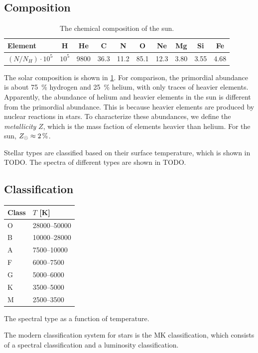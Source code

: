\subsection{Composition}
\begin{table}
	\begin{tabular}{lccccccccc}
	\toprule
	Element & H & He & C & N & O & Ne & Mg & Si & Fe\\
	\midrule
	$(N/N_H) \cdot 10^5$ & $10^5$ & 9800 & 36.3 & 11.2 & 85.1 & 12.3 & 3.80 & 3.55 & 4.68\\
	\bottomrule
	\end{tabular}
	\caption{The chemical composition of the sun.}
	\label{tab:solar-comp}
\end{table}
The solar composition is shown in \cref{tab:solar-comp}.
For comparison, the primordial abundance is about \SI{75}{\percent} hydrogen and \SI{25}{\percent} helium, with only traces of heavier elements.
Apparently, the abundance of helium and heavier elements in the sun is different from the primordial abundance.
This is because heavier elements are produced by nuclear reactions in stars.
To characterize these abundances, we define the \emph{metallicity} $Z$, which is the mass faction of elements heavier than helium.
For the sun, $Z_\odot \approx \SI{2}{\percent}$.

Stellar types are classified based on their surface temperature, which is shown in TODO.
The spectra of different types are shown in TODO.


\subsection{Classification}
\begin{margintable}
	\begin{tabular}{ll}
		\toprule
		Class & $T$ [K]\\
		\midrule
		O & \num{28000}--\num{50000}\\
		B & \num{10000}--\num{28000}\\
		A & \num{7500}--\num{10000}\\
		F & \num{6000}--\num{7500}\\
		G & \num{5000}--\num{6000}\\
		K & \num{3500}--\num{5000}\\
		M & \num{2500}--\num{3500}\\
		\bottomrule
	\end{tabular}
	\caption{The spectral type as a function of temperature.}
	\label{tab:spectral-type}
\end{margintable}
The modern classification system for stars is the MK classification, which consists of a spectral classification and a luminosity classification.

